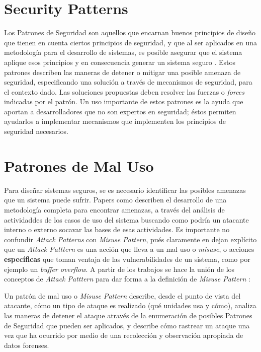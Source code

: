 \section{Security Patterns}
\label{chap2:SecPatt}
Los Patrones de Seguridad son aquellos que encarnan buenos principios de diseño que tienen en cuenta ciertos principios de seguridad, y que al ser aplicados en una metodología para el desarrollo de sistemas, es posible asegurar que el sistema aplique esos principios y en consecuencia generar un sistema seguro \cite{fernandez2004methodology, fernandez2013security}. Estos patrones describen las maneras de detener o mitigar una posible amenaza de seguridad, especificando una solución a través de mecanismos de seguridad, para el contexto dado. Las soluciones propuestas deben resolver las fuerzas o \textit{forces} indicadas por el patrón. Un uso importante de estos patrones es la ayuda que aportan a desarrolladores que no son expertos en seguridad; éstos permiten ayudarlos a implementar mecanismos que implementen los principios de seguridad necesarios.

\section{Patrones de Mal Uso}
Para diseñar sistemas seguros, se es necesario identificar las posibles amenazas que un sistema puede sufrir. Papers como \cite{fernandez2006defining, fernandez2007attack, braz2008elicitin, fernandez2013security} describen el desarrollo de una metodología completa para encontrar amenazas, a través del análisis de actividaddes de los casos de uso del sistema buscando como podría un atacante interno o externo socavar las bases de esas actividades. Es importante no confundir \textit{Attack Patterns} con \textit{Misuse Pattern}, pués claramente en \cite{ModMisusePatt, fernandez2013security} dejan explícito que un \textit{Attack Patttern} es una acción que lleva a un mal uso o \textit{misuse}, o acciones \textbf{específicas} que toman ventaja de las vulnerabilidades de un sistema, como por ejemplo un \textit{buffer overflow}. A partir de los trabajos \cite{fernandez2007attack, yoshioka2006development, yoshioka2007integration}  se hace la unión de los conceptos de \textit{Attack Patttern} para dar forma a la definición de \textit{Misuse Pattern} \cite{ModMisusePatt, pelaez2009misuse, fernandez2010worm, hashizume2011misuse, munoz2011misuse, fernandez2012misuse, alkazimi2014, encinamisuse}:
\begin{center}
    Un patrón de mal uso o \textit{Misuse Pattern} describe, desde el punto de vista del atacante, cómo un tipo de ataque es realizado (qué unidades usa y cómo), analiza las maneras de detener el ataque através de la enumeración de posibles Patrones de Seguridad que pueden ser aplicados, y describe cómo rastrear un ataque una vez que ha ocurrido por medio de una recolección y observación apropiada de datos forenses.
\end{center}

